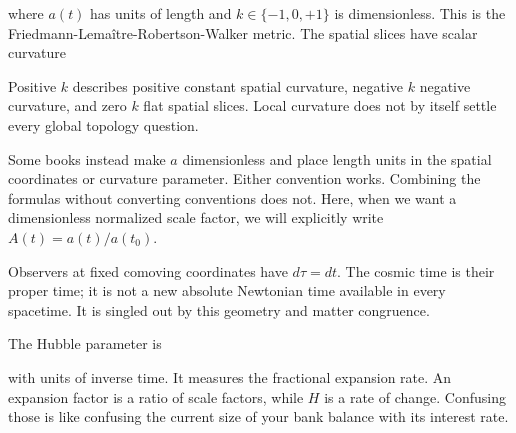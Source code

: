 \documentclass[
  11pt,
  letterpaper,
  oneside,
  openany]{scrbook}
\begin{document}
\begin{center}
\begingroup
{}
\ifdim\wd\grmathbox>\linewidth
\resizebox{\linewidth}{!}{\usebox{\grmathbox}}
\else\usebox{\grmathbox}\fi
\endgroup
\end{center}

where \(a(t)\) has units of length and \(k\in\{-1,0,+1\}\) is
dimensionless. This is the Friedmann-Lemaître-Robertson-Walker metric.
The spatial slices have scalar curvature

\begin{center}
\begingroup
{}
\ifdim\wd\grmathbox>\linewidth
\resizebox{\linewidth}{!}{\usebox{\grmathbox}}
\else\usebox{\grmathbox}\fi
\endgroup
\end{center}

Positive \(k\) describes positive constant spatial curvature, negative
\(k\) negative curvature, and zero \(k\) flat spatial slices. Local
curvature does not by itself settle every global topology question.

Some books instead make \(a\) dimensionless and place length units in
the spatial coordinates or curvature parameter. Either convention works.
Combining the formulas without converting conventions does not. Here,
when we want a dimensionless normalized scale factor, we will explicitly
write \(A(t)=a(t)/a(t_0)\).

Observers at fixed comoving coordinates have \(d\tau=dt\). The cosmic
time is their proper time; it is not a new absolute Newtonian time
available in every spacetime. It is singled out by this geometry and
matter congruence.

The Hubble parameter is

\begin{center}
\begingroup
{}
\ifdim\wd\grmathbox>\linewidth
\resizebox{\linewidth}{!}{\usebox{\grmathbox}}
\else\usebox{\grmathbox}\fi
\endgroup
\end{center}

with units of inverse time. It measures the fractional expansion rate.
An expansion factor is a ratio of scale factors, while \(H\) is a rate
of change. Confusing those is like confusing the current size of your
bank balance with its interest rate.
\end{document}
